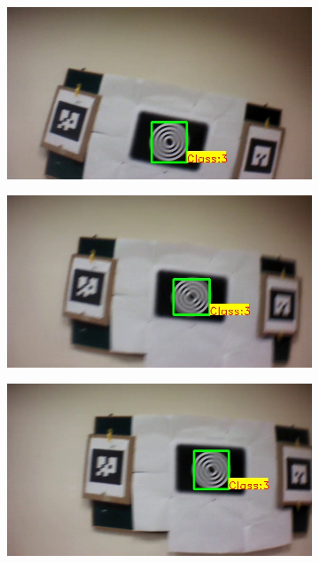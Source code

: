 \documentclass[runningheads]{llncs}
\begin{document}
\begin{figure}
\begin{subfigure}[b]{.19\textwidth}
\end{subfigure}
\begin{subfigure}[b]{.19\textwidth}
\includegraphics[width=\linewidth]{BLUT_input_11/output3.jpg}
\end{subfigure}
\begin{subfigure}[b]{.19\textwidth}
\includegraphics[width=\linewidth]{BLUT_input_11/output4.jpg}
\end{subfigure}
\begin{subfigure}[b]{.19\textwidth}
\includegraphics[width=\linewidth]{BLUT_input_11/output5.jpg}

\end{subfigure}
\end{figure}
\end{document}
